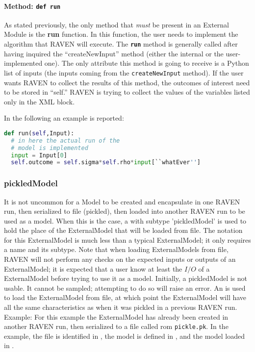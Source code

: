 \paragraph{Method: \texttt{def run}}
\label{subsubsubsec:externalRun}
As stated previously, the only method that \emph{must} be present in an
External Module is the \textbf{run} function.
%
In this function, the user needs to implement the algorithm that RAVEN will
execute.
%
The \texttt{\textbf{run}} method is generally called after having inquired the
``createNewInput'' method (either the internal or the user-implemented one).
%
The only attribute this method is going to receive is a Python list of inputs
(the inputs coming from the \texttt{createNewInput} method).
%
If the user wants RAVEN to collect the results of this method, the outcomes of
interest need to be stored in ``self.''
%
\nb RAVEN is trying to collect the values of the variables listed only in the
 XML block.
%

In the following an example is reported:
\begin{lstlisting}[language=python]
def run(self,Input):
  # in here the actual run of the
  # model is implemented
  input = Input[0]
  self.outcome = self.sigma*self.rho*input[``whatEver'']
\end{lstlisting}


\subsubsection{pickledModel}
\label{subsubsec:pickledModel}
It is not uncommon for a Model to be created and encapsulate in one RAVEN
run, then serialized to file (pickled), then loaded into another RAVEN run to be used as a model.
When this is the case, a  with subtype ’pickledModel’ is used to hold the place of the
ExternalModel that will be loaded from file. The notation for this ExternalModel is much less than a typical ExternalModel; it
only requires a name and its subtype.
Note that when loading ExternalModels from file, RAVEN will not perform any checks on the expected
inputs or outputs of an ExternalModel; it is expected that a user know at least the $I/O$ of a ExternalModel before trying
to use it as a model.  
Initially, a pickledModel is not usable. It cannot be sampled; attempting to do so will
raise an error. An  is used to load the ExternalModel from file, at which point the ExternalModel will
have all the same characteristics as when it was pickled in a previous RAVEN run.
Example: For this example the ExternalModel has already been created in another RAVEN
run, then serialized to a file called rom \texttt{pickle.pk}. In the example, the file is identified in
, the model is defined in , and the model loaded in .

